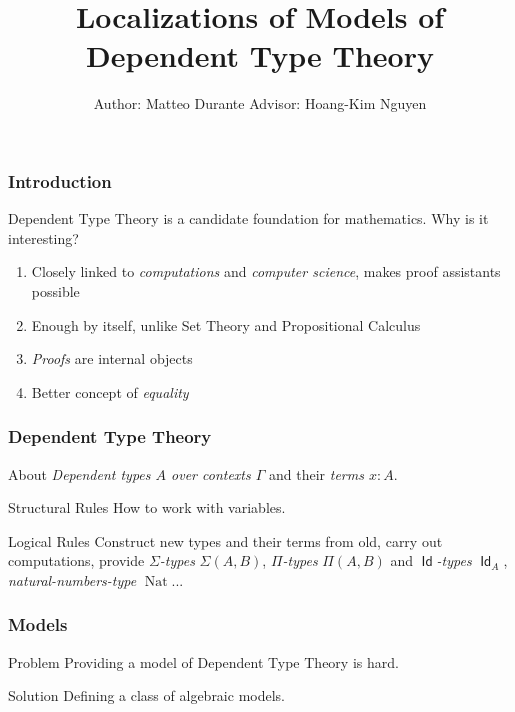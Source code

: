 \documentclass{beamer}
\title{Localizations of Models of Dependent Type Theory}
\author{Author: Matteo Durante \quad\quad\quad Advisor: Hoang-Kim Nguyen}
\institute{Regensburg University}
\DeclareMathOperator{\Id}{\mathsf{Id}}
\DeclareMathOperator{\nat}{Nat}
\begin{document}
\theoremstyle{plain}

\newtheorem{thm}{Theorem}[section]
\newtheorem{prop}{Proposition}[section]
\newtheorem{defn}{Definition}[section]
\newtheorem{conj}{Conjecture}[section]
\newtheorem{lem}{Lemma}[section]

\frame{\titlepage}

\begin{frame}
  \frametitle{Introduction}

  Dependent Type Theory is a candidate foundation for mathematics. Why is it
  interesting?

  \begin{enumerate}
    \item Closely linked to \emph{computations} and \emph{computer science},
      makes proof assistants possible
    \item Enough by itself, unlike Set Theory and Propositional Calculus
    \item \emph{Proofs} are internal objects
    \item Better concept of \emph{equality}
  \end{enumerate}
\end{frame}

\begin{frame}
  \frametitle{Dependent Type Theory}
  
  \begin{block}{About}
    \emph{Dependent types $A$ over contexts
    $\Gamma$} and their \emph{terms $x:A$}.
  \end{block}

  \begin{block}{Structural Rules}
    How to work with variables.
  \end{block}

  \begin{block}{Logical Rules}
    Construct new types and their terms from old, carry out
    computations, provide \emph{$\Sigma$-types} $\Sigma(A,B)$, \emph{$\Pi$-types}
    $\Pi(A,B)$ and \emph{$\Id$-types} $\Id_A$, \emph{natural-numbers-type}
    $\nat$...
  \end{block}
\end{frame}

\begin{frame}
  \frametitle{Models}

  \begin{block}{Problem}
    Providing a model of Dependent Type Theory is hard.
  \end{block}

  \begin{block}{Solution}
    Defining a class of algebraic models.
  \end{block}
\end{frame}
\end{document}
